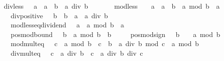 \begin{isabellebody}
\ \ \ div{\isacharunderscore}{\kern0pt}less{\isacharcolon}{\kern0pt}\ {\isachardoublequoteopen}{}\ {\isasymle}\ a\ {\isasymLongrightarrow}\ a\ {\isacharless}{\kern0pt}\ b\ {\isasymLongrightarrow}\ a\ div\ b\ {\isacharequal}{\kern0pt}\ {}{\isachardoublequoteclose}\isanewline
\ \ \ \ \ mod{\isacharunderscore}{\kern0pt}less{\isacharcolon}{\kern0pt}\ {\isachardoublequoteopen}\ {}\ {\isasymle}\ a\ {\isasymLongrightarrow}\ a\ {\isacharless}{\kern0pt}\ b\ {\isasymLongrightarrow}\ a\ mod\ b\ {\isacharequal}{\kern0pt}\ a{\isachardoublequoteclose}\isanewline
\ \ \ \ \ div{\isacharunderscore}{\kern0pt}positive{\isacharcolon}{\kern0pt}\ {\isachardoublequoteopen}{}\ {\isacharless}{\kern0pt}\ b\ {\isasymLongrightarrow}\ b\ {\isasymle}\ a\ {\isasymLongrightarrow}\ a\ div\ b\ {\isachargreater}{\kern0pt}\ {}{\isachardoublequoteclose}\isanewline
\ \ \ \ \ mod{\isacharunderscore}{\kern0pt}less{\isacharunderscore}{\kern0pt}eq{\isacharunderscore}{\kern0pt}dividend{\isacharcolon}{\kern0pt}\ {\isachardoublequoteopen}{}\ {\isasymle}\ a\ {\isasymLongrightarrow}\ a\ mod\ b\ {\isasymle}\ a{\isachardoublequoteclose}\isanewline
\ \ \ \ \ pos{\isacharunderscore}{\kern0pt}mod{\isacharunderscore}{\kern0pt}bound{\isacharcolon}{\kern0pt}\ {\isachardoublequoteopen}{}\ {\isacharless}{\kern0pt}\ b\ {\isasymLongrightarrow}\ a\ mod\ b\ {\isacharless}{\kern0pt}\ b{\isachardoublequoteclose}\isanewline
\ \ \ \ \ pos{\isacharunderscore}{\kern0pt}mod{\isacharunderscore}{\kern0pt}sign{\isacharcolon}{\kern0pt}\ {\isachardoublequoteopen}{}\ {\isacharless}{\kern0pt}\ b\ {\isasymLongrightarrow}\ {}\ {\isasymle}\ a\ mod\ b{\isachardoublequoteclose}\isanewline
\ \ \ \ \ mod{\isacharunderscore}{\kern0pt}mult{}{\isacharunderscore}{\kern0pt}eq{\isacharcolon}{\kern0pt}\ {\isachardoublequoteopen}{}\ {\isasymle}\ c\ {\isasymLongrightarrow}\ a\ mod\ {\isacharparenleft}{\kern0pt}b\ {\isacharasterisk}{\kern0pt}\ c{\isacharparenright}{\kern0pt}\ {\isacharequal}{\kern0pt}\ b\ {\isacharasterisk}{\kern0pt}\ {\isacharparenleft}{\kern0pt}a\ div\ b\ mod\ c{\isacharparenright}{\kern0pt}\ {\isacharplus}{\kern0pt}\ a\ mod\ b{\isachardoublequoteclose}\isanewline
\ \ \ \ \ div{\isacharunderscore}{\kern0pt}mult{}{\isacharunderscore}{\kern0pt}eq{\isacharcolon}{\kern0pt}\ {\isachardoublequoteopen}{}\ {\isasymle}\ c\ {\isasymLongrightarrow}\ a\ div\ {\isacharparenleft}{\kern0pt}b\ {\isacharasterisk}{\kern0pt}\ c{\isacharparenright}{\kern0pt}\ {\isacharequal}{\kern0pt}\ a\ div\ b\ div\ c{\isachardoublequoteclose}\isanewline

\end{isabellebody}
